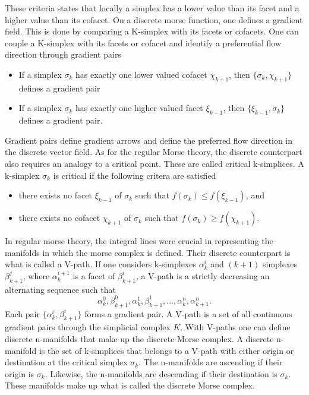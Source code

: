 These criteria states that locally a simplex has a lower value than its facet and
a higher value than its cofacet. On a discrete morse function, one defines a
gradient field. This is done by comparing a K-simplex with its facets or
cofacets. One can couple a K-simplex with its facets or cofacet and identify a
preferential flow direction through gradient pairs
\begin{itemize}
    \item If a simplex $\sigma_k$ has exactly one lower valued cofacet $\chi_{k+1}$, then
          $\{\sigma_k,\chi_{k+1}\}$ defines a gradient pair
    \item If a simplex $\sigma_k$ has exactly one higher valued facet $\xi_{k-1}$, then
          $\{\xi_{k-1},\sigma_{k}\}$ defines a gradient pair.
\end{itemize}
Gradient pairs define gradient arrows and define the preferred flow direction in
the discrete vector field. As for the regular Morse theory, the discrete
counterpart also requires an analogy to a critical point. These are called
critical k-simplices. A k-simplex $\sigma_k$ is critical if the following
critera are satisfied
\begin{itemize}
    \item there exists no facet $\xi_{k-1}$ of $\sigma_{k}$ such
    that $f(\sigma_k)\leq f(\xi_{k-1})$, and
    \item there exists no cofacet $\chi_{k+1}$ of $\sigma_{k}$ such
    that $f(\sigma_k)\geq f(\chi_{k+1})$.
\end{itemize}
In regular morse theory, the integral lines were crucial in representing the
manifolds in which the morse complex is defined. Their discrete counterpart
is what is called a V-path. If one considers k-simplexes $\alpha^i_k$ and
$(k+1)$ simplexes $\beta^j_{k+1}$, where $\alpha^{i+1}_k$ is a facet of $\beta^i_{k+1}$, a
V-path is a strictly decreasing an alternating sequence such that
\begin{equation}
    \alpha^0_k, \beta^0_{k+1},\alpha^1_k,\beta^1_{k+1},\dots,\alpha^n_k,\alpha^n_{k+1}.
\end{equation}
Each pair $\{\alpha^i_k,\beta^i_{k+1}\}$ forms a gradient pair. A V-path is a set
of all continuous gradient pairs through the simplicial complex $K$.
With V-paths one can define discrete n-manifolds that make up the discrete
Morse complex. A discrete n-manifold is the set of k-simplices that belongs to a
V-path with either origin or destination at the critical simplex $\sigma_k$.
The n-manifolds are ascending if their origin is $\sigma_k$. Likewise,
the n-manifolds are descending if their destination is $\sigma_k$. These
manifolds make up what is called the discrete Morse complex.

